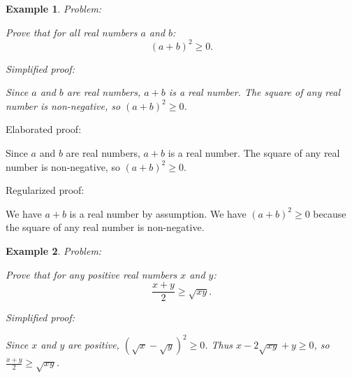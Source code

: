 \documentclass{article}
\newtheorem{example}{Example}
\begin{document}



\begin{example}
Problem:
\begin{tcolorbox}[colback=yellow!10, width=\linewidth]
Prove that for all real numbers $a$ and $b$:
    $$(a+b)^2 \geq 0.$$
\end{tcolorbox}

Simplified proof:
\begin{tcolorbox}[colback=blue!10, width=\linewidth]
Since $a$ and $b$ are real numbers, $a+b$ is a real number.  The square of any real number is non-negative, so $(a+b)^2 \ge 0$.
\end{tcolorbox}
\end{example}

Elaborated proof:
\begin{tcolorbox}[colback=green!10, width=\linewidth]
Since $a$ and $b$ are real numbers, $a+b$ is a real number.  The square of any real number is non-negative, so $(a+b)^2 \ge 0$.
\end{tcolorbox}

Regularized proof:
\begin{tcolorbox}[colback=red!10, width=\linewidth]
We have $a+b$ is a real number by assumption.
We have $(a+b)^2 \ge 0$ because the square of any real number is non-negative.
\end{tcolorbox}



\begin{example}
Problem:
\begin{tcolorbox}[colback=yellow!10, width=\linewidth]
Prove that for any positive real numbers $x$ and $y$:
    $$\frac{x+y}{2} \geq \sqrt{xy}.$$
\end{tcolorbox}

Simplified proof:
\begin{tcolorbox}[colback=blue!10, width=\linewidth]
Since $x$ and $y$ are positive, $(\sqrt x - \sqrt y)^2 \ge 0$. Thus $x - 2\sqrt{xy} + y \ge 0$, so $\frac{x+y}{2} \ge \sqrt{xy}$.
\end{tcolorbox}
\end{example}
\end{document}
